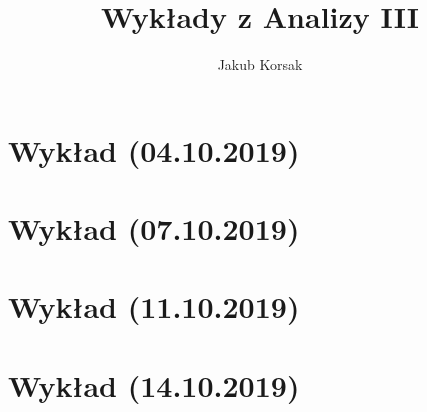 \documentclass{article}
\title{Wykłady z Analizy III}
\author{Jakub Korsak}
\begin{document}
\maketitle

\pagebreak
\section{Wykład (04.10.2019)}

\pagebreak
\section{Wykład (07.10.2019)}

\pagebreak
\section{Wykład (11.10.2019)}

\pagebreak
\section{Wykład (14.10.2019)}

\end{document}
